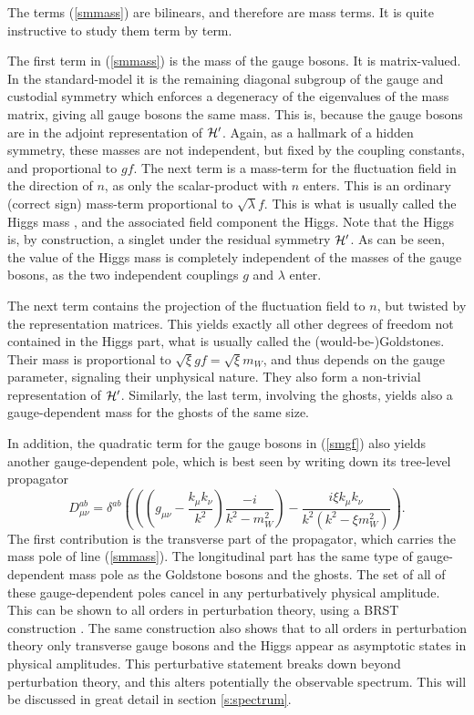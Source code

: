 \documentclass[final,12pt]{article}
\newcommand*{\no}{\noindent}
\newcommand*{\be}{\begin{equation}}
\newcommand*{\ee}{\end{equation}}
\newcommand*{\pref}[1]{(\ref{#1})}
\newcommand*{\mn}{{\mu\nu}}
\newcommand*{\1}{1\!\!\!\bot}
\begin{document}
The terms \pref{smmass} are bilinears, and therefore are mass terms. It is quite instructive to study them term by term.

The first term in \pref{smmass} is the mass of the gauge bosons. It is matrix-valued. In the standard-model it is the remaining diagonal subgroup of the gauge and custodial symmetry which enforces a degeneracy of the eigenvalues of the mass matrix, giving all gauge bosons the same mass. This is, because the gauge bosons are in the adjoint representation of ${\cal H}'$. Again, as a hallmark of a hidden symmetry, these masses are not independent, but fixed by the coupling constants, and proportional to $gf$. The next term is a mass-term for the fluctuation field in the direction of $n$, as only the scalar-product with $n$ enters. This is an ordinary (correct sign) mass-term proportional to $\sqrt{\lambda}f$. This is what is usually called the Higgs mass \cite{pdg,Bohm:2001yx}, and the associated field component the Higgs. Note that the Higgs is, by construction, a singlet under the residual symmetry ${\cal H}'$. As can be seen, the value of the Higgs mass is completely independent of the masses of the gauge bosons, as the two independent couplings $g$ and $\lambda$ enter.

The next term contains the projection of the fluctuation field to $n$, but twisted by the representation matrices. This yields exactly all other degrees of freedom not contained in the Higgs part, what is usually called the (would-be-)Goldstones. Their mass is proportional to $\sqrt{\xi}gf=\sqrt{\xi}m_W$, and thus depends on the gauge parameter, signaling their unphysical nature. They also form a non-trivial representation of ${\cal H}'$. Similarly, the last term, involving the ghosts, yields also a gauge-dependent mass for the ghosts of the same size.

In addition, the quadratic term for the gauge bosons in \pref{smgf} also yields another gauge-dependent pole, which is best seen by writing down its tree-level propagator \cite{Bohm:2001yx}
\be
D_\mn^{ab}=\delta^{ab}\left(\left(\left(g_\mn-\frac{k_\mu k_\nu}{k^2}\right)\frac{-i}{k^2-m_W^2}\right)-\frac{i\xi k_\mu k_\nu}{k^2(k^2-\xi m_W^2)}\right)\label{wprop}.
\ee
\no The first contribution is the transverse part of the propagator, which carries the mass pole of line \pref{smmass}. The longitudinal part has the same type of gauge-dependent mass pole as the Goldstone bosons and the ghosts. The set of all of these gauge-dependent poles cancel in any perturbatively physical amplitude. This can be shown to all orders in perturbation theory, using a BRST construction \cite{Bohm:2001yx,DePalma:2013kua}. The same construction also shows that to all orders in perturbation theory only transverse gauge bosons and the Higgs appear as asymptotic states in physical amplitudes. This perturbative statement breaks down beyond perturbation theory, and this alters potentially the observable spectrum. This will be discussed in great detail in section \ref{s:spectrum}.
\end{document}
